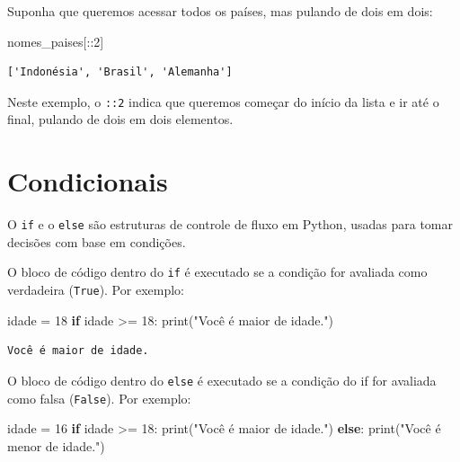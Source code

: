 \documentclass[
  portuguese,
  letterpaper,
  DIV=11,
  numbers=noendperiod]{scrreprt}
\newenvironment{Shaded}{\begin{snugshade}}{\end{snugshade}}
\newcommand{\BuiltInTok}[1]{\textcolor[rgb]{0.00,0.23,0.31}{#1}}
\newcommand{\ControlFlowTok}[1]{\textcolor[rgb]{0.00,0.23,0.31}{\textbf{#1}}}
\newcommand{\DecValTok}[1]{\textcolor[rgb]{0.68,0.00,0.00}{#1}}
\newcommand{\NormalTok}[1]{\textcolor[rgb]{0.00,0.23,0.31}{#1}}
\newcommand{\OperatorTok}[1]{\textcolor[rgb]{0.37,0.37,0.37}{#1}}
\newcommand{\StringTok}[1]{\textcolor[rgb]{0.13,0.47,0.30}{#1}}
\theoremstyle{definition}
\theoremstyle{remark}
\begin{document}
Suponha que queremos acessar todos os países, mas pulando de dois em
dois:

\begin{Shaded}
\begin{Highlighting}[]
\NormalTok{nomes\_paises[::}\DecValTok{2}\NormalTok{]}
\end{Highlighting}
\end{Shaded}

\begin{verbatim}
['Indonésia', 'Brasil', 'Alemanha']
\end{verbatim}

Neste exemplo, o \texttt{::2} indica que queremos começar do início da
lista e ir até o final, pulando de dois em dois elementos.

\section{Condicionais}\label{condicionais}

O \texttt{if} e o \texttt{else} são estruturas de controle de fluxo em
Python, usadas para tomar decisões com base em condições.

O bloco de código dentro do \texttt{if} é executado se a condição for
avaliada como verdadeira (\texttt{True}). Por exemplo:

\begin{Shaded}
\begin{Highlighting}[]
\NormalTok{idade }\OperatorTok{=} \DecValTok{18}
\ControlFlowTok{if}\NormalTok{ idade }\OperatorTok{\textgreater{}=} \DecValTok{18}\NormalTok{:}
    \BuiltInTok{print}\NormalTok{(}\StringTok{"Você é maior de idade."}\NormalTok{)}
\end{Highlighting}
\end{Shaded}

\begin{verbatim}
Você é maior de idade.
\end{verbatim}

O bloco de código dentro do \texttt{else} é executado se a condição do
if for avaliada como falsa (\texttt{False}). Por exemplo:

\begin{Shaded}
\begin{Highlighting}[]
\NormalTok{idade }\OperatorTok{=} \DecValTok{16}
\ControlFlowTok{if}\NormalTok{ idade }\OperatorTok{\textgreater{}=} \DecValTok{18}\NormalTok{:}
    \BuiltInTok{print}\NormalTok{(}\StringTok{"Você é maior de idade."}\NormalTok{)}
\ControlFlowTok{else}\NormalTok{:}
    \BuiltInTok{print}\NormalTok{(}\StringTok{"Você é menor de idade."}\NormalTok{)}
\end{Highlighting}
\end{Shaded}
\end{document}
